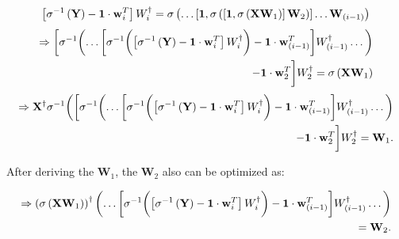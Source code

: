 \documentclass[runningheads]{llncs}
\begin{document}
\begin{equation*}
    \left[\sigma^{-1}\left(\mathbf{Y}\right)-\mathbf{1}\cdot\mathbf{w}_{i}^{T}\right]\mathnormal{W}_{i}^\dagger = 
    \sigma\left(\dots\left[\mathbf{1},\sigma\left(\left[\mathbf{1},\sigma\left(\mathbf{X}\mathbf{W}_{1}\right)\right]\mathbf{W}_{2}\right)\right]\dots\mathbf{W}_{(i-1)}\right)
\end{equation*}
\begin{equation*}
    \begin{aligned}
        \Rightarrow
        \biggl[\sigma^{-1}\biggl(
        \dots
        \biggl[\sigma^{-1}\biggl(
            \left[\sigma^{-1}\left(\mathbf{Y}\right)-\mathbf{1}\cdot\mathbf{w}_{i}^{T}\right]\mathnormal{W}_{i}^\dagger
        \biggr)
        - \mathbf{1}\cdot\mathbf{w}_{(i-1)}^{T}\biggr]\mathnormal{W}_{(i-1)}^{\dagger}
        \dots\biggr)\\
        - \mathbf{1}\cdot\mathbf{w}_{2}^{T}\biggr]\mathnormal{W}_{2}^{\dagger} 
        = \sigma\left(\mathbf{X}\mathbf{W}_{1}\right)
    \end{aligned}
\end{equation*}
\begin{equation}
    \begin{aligned}
        \Rightarrow
        \mathbf{X}^{\dagger}\sigma^{-1}\biggl(
        \biggl[\sigma^{-1}\biggl(
        \dots
        \biggl[\sigma^{-1}\biggl(
            \left[\sigma^{-1}\left(\mathbf{Y}\right)-\mathbf{1}\cdot\mathbf{w}_{i}^{T}\right]\mathnormal{W}_{i}^\dagger
        \biggr)
        - \mathbf{1}\cdot\mathbf{w}_{(i-1)}^{T}\biggr]\mathnormal{W}_{(i-1)}^{\dagger}
        \dots\biggr)\\
        - \mathbf{1}\cdot\mathbf{w}_{2}^{T}\biggr]\mathnormal{W}_{2}^{\dagger}
        = \mathbf{W}_{1} .
    \end{aligned}
\end{equation}

After deriving the $\mathbf{W}_{1}$, the $\mathbf{W}_{2}$ also can be optimized as:

\begin{equation}
    \begin{aligned}
        \Rightarrow
        \left(\sigma\left(\mathbf{X}\mathbf{W}_{1}\right)\right)^{\dagger}
        \biggl(\dots
        \biggl[\sigma^{-1}\biggl(
            \left[\sigma^{-1}\left(\mathbf{Y}\right)-\mathbf{1}\cdot\mathbf{w}_{i}^{T}\right]\mathnormal{W}_{i}^\dagger
        \biggr)
        - \mathbf{1}\cdot\mathbf{w}_{(i-1)}^{T}\biggr]\mathnormal{W}_{(i-1)}^{\dagger}
        \dots\biggr)\\
        = \mathbf{W}_{2} .
    \end{aligned}
\end{equation}
\end{document}
